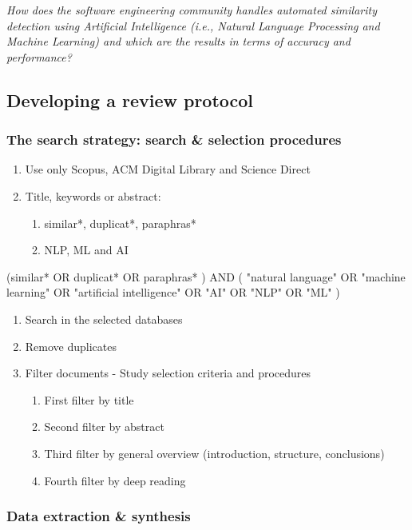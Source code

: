 \textit{How does the software engineering community handles automated similarity detection using Artificial Intelligence (i.e., Natural Language Processing and Machine Learning) and which are the results in terms of accuracy and performance?}

\subsection{Developing a review protocol}

\subsubsection{The search strategy: search \& selection procedures}

\begin{enumerate}
\item Use only Scopus, ACM Digital Library and Science Direct
\item Title, keywords or abstract:
\begin{enumerate}
\item similar*, duplicat*, paraphras*
\item NLP, ML and AI
\end{enumerate}
\end{enumerate}

\begin{center}
(similar*  OR  duplicat*  OR  paraphras* )  AND  ( "natural language"  OR  "machine learning"  OR  "artificial intelligence"  OR  "AI" OR  "NLP"  OR  "ML" )
\end{center}

\begin{enumerate}
\item Search in the selected databases
\item Remove duplicates
\item Filter documents - Study selection criteria and procedures
\begin{enumerate}
\item First filter by title
\item Second filter by abstract
\item Third filter by general overview (introduction, structure, conclusions)
\item Fourth filter by deep reading
\end{enumerate}
\end{enumerate}

\subsubsection{Data extraction \& synthesis}

